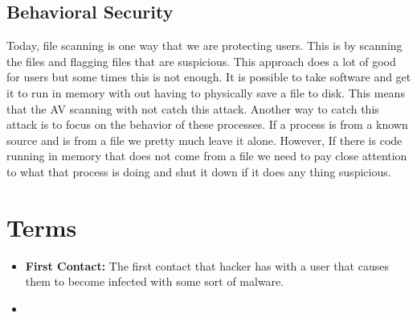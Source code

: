 \documentclass[letterpaper, onecolumn,10pt]{IEEEtran}
\begin{document}
            \subsection{Behavioral Security}
            Today, file scanning is one way that we are protecting users. This is by scanning the files and flagging files that are suspicious. This approach does a lot of good for users but some times this is not enough. It is possible to take software and get it to run in memory with out having to physically save a file to disk. This means that the AV scanning with not catch this attack. Another way to catch this attack is to focus on the behavior of these processes. If a process is from a known source and is from a file we pretty much leave it alone. However, If there is code running in memory that does not come from a file we need to pay close attention to what that process is doing and shut it down if it does any thing suspicious.\\
            
            \subsection{}

        \section{Terms}
            \begin{itemize}
                \item \textbf{First Contact:} The first contact that hacker has with a user that causes them to become infected with some sort of malware.\\
                \item \textbf{}
            \end{itemize}

		
\end{document}

